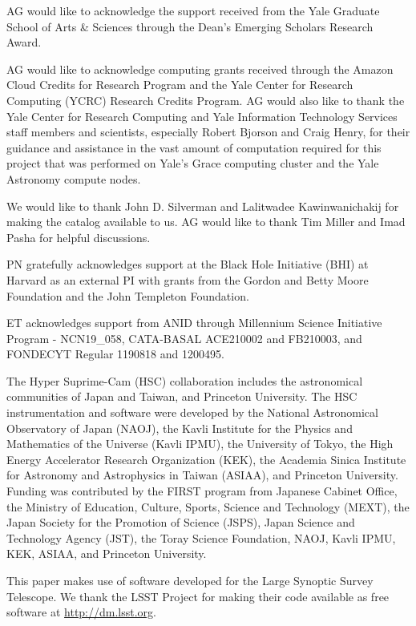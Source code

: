 \documentclass[linenumbers,twocolumn,twocolappendix]{aastex631}
\begin{document}
\begin{CJK*}{UTF8}{gbsn}
AG would like to acknowledge the support received from the Yale Graduate School of Arts \& Sciences through the Dean's Emerging Scholars Research Award.

AG would like to acknowledge computing grants received through the Amazon Cloud Credits for Research Program and the Yale Center for Research Computing (YCRC) Research Credits Program. AG would also like to thank the Yale Center for Research Computing and Yale Information Technology Services staff members and scientists, especially Robert Bjorson and Craig Henry, for their guidance and assistance in the vast amount of computation required for this project that was performed on Yale's Grace computing cluster and the Yale Astronomy compute nodes. 

We would like to thank John D. Silverman and Lalitwadee Kawinwanichakij for making the \citet{hsc_sersic} catalog available to us. AG would like to thank Tim Miller and Imad Pasha for helpful discussions.

PN gratefully acknowledges support at the Black Hole Initiative (BHI) at Harvard as an external PI with grants from the Gordon and Betty Moore Foundation and the John Templeton Foundation.

ET acknowledges support from ANID through Millennium Science Initiative Program - NCN19\_058, CATA-BASAL ACE210002 and FB210003, and FONDECYT Regular 1190818 and 1200495.

The Hyper Suprime-Cam (HSC) collaboration includes the astronomical communities of Japan and Taiwan, and Princeton University. The HSC instrumentation and software were developed by the National Astronomical Observatory of Japan (NAOJ), the Kavli Institute for the Physics and Mathematics of the Universe (Kavli IPMU), the University of Tokyo, the High Energy Accelerator Research Organization (KEK), the Academia Sinica Institute for Astronomy and Astrophysics in Taiwan (ASIAA), and Princeton University. Funding was contributed by the FIRST program from Japanese Cabinet Office, the Ministry of Education, Culture, Sports, Science and Technology (MEXT), the Japan Society for the Promotion of Science (JSPS), Japan Science and Technology Agency (JST), the Toray Science Foundation, NAOJ, Kavli IPMU, KEK, ASIAA, and Princeton University. 

This paper makes use of software developed for the Large Synoptic Survey Telescope. We thank the LSST Project for making their code available as free software at  \href{http://dm.lsst.org}{http://dm.lsst.org}.


\end{CJK*}
\end{document}
